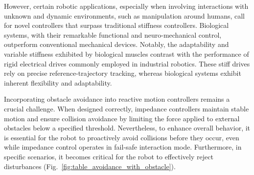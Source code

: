 However, certain robotic applications, especially when involving interactions with unknown and dynamic environments, such as manipulation around humans, call for novel controllers that surpass traditional stiffness controllers. Biological systems, with their remarkable functional and neuro-mechanical control, outperform conventional mechanical devices. Notably, the adaptability and variable stiffness exhibited by biological muscles contrast with the performance of rigid electrical drives commonly employed in industrial robotics. These stiff drives rely on precise reference-trajectory tracking, whereas biological systems exhibit inherent flexibility and adaptability.

Incorporating obstacle avoidance into reactive motion controllers remains a crucial challenge. When designed correctly, impedance controllers maintain stable motion and ensure collision avoidance by limiting the force applied to external obstacles below a specified threshold. Nevertheless, to enhance overall behavior, it is essential for the robot to proactively avoid collisions before they occur, even while impedance control operates in fail-safe interaction mode. Furthermore, in specific scenarios, it becomes critical for the robot to effectively reject disturbances (Fig.~\ref{fig:table_avoidance_with_obstacle}). 

